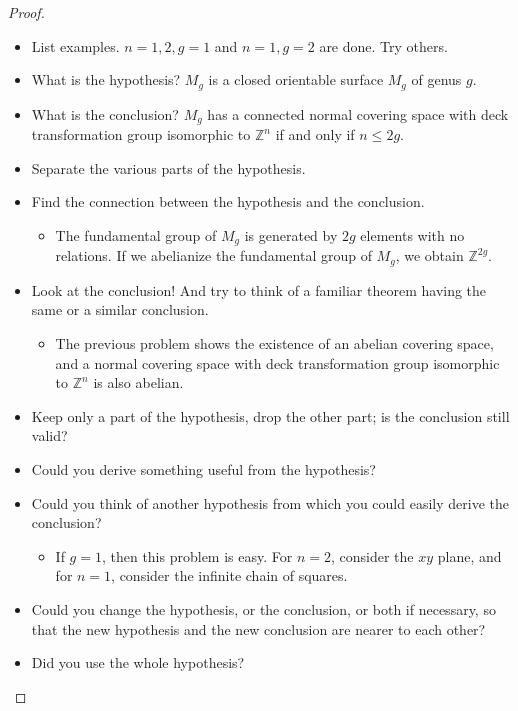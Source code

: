 \documentclass[12pt, psamsfonts]{amsart}
\theoremstyle{definition}
\theoremstyle{remark}
\numberwithin{equation}{section}
\begin{document}
\begin{proof}
  \begin{itemize}
    \item
      List examples.
      $n = 1, 2, g = 1$ and $n = 1, g = 2$ are done.
      Try others.
    \item
      What is the hypothesis?
      $M_g$ is a closed orientable surface $M_g$ of genus $g$.
    \item
      What is the conclusion?
      $M_g$ has a connected normal covering space with deck transformation group isomorphic to $\mathbb{Z}^n$ if and only if $n \leq 2g$.
    \item Separate the various parts of the hypothesis.
    \item Find the connection between the hypothesis and the conclusion.
      \begin{itemize}
        \item
          The fundamental group of $M_g$ is generated by $2g$ elements with no relations.
          If we abelianize the fundamental group of $M_g$, we obtain $\mathbb{Z}^{2g}$.
      \end{itemize}
    \item Look at the conclusion! And try to think of a familiar theorem having the same or a similar conclusion.
      \begin{itemize}
        \item
          The previous problem shows the existence of an abelian covering space, and a normal covering space with deck transformation group isomorphic to $\mathbb{Z}^n$ is also abelian.
      \end{itemize}
    \item Keep only a part of the hypothesis, drop the other part; is the conclusion still valid?
    \item Could you derive something useful from the hypothesis?
    \item Could you think of another hypothesis from which you could easily derive the conclusion?
      \begin{itemize}
        \item
          If $g = 1$, then this problem is easy.
          For $n = 2$, consider the $xy$ plane, and for $n = 1$, consider the infinite chain of squares.
      \end{itemize}
    \item Could you change the hypothesis, or the conclusion, or both if necessary, so that the new hypothesis and the new conclusion are nearer to each other?
    \item Did you use the whole hypothesis?
  \end{itemize}
\end{proof}
\end{document}
